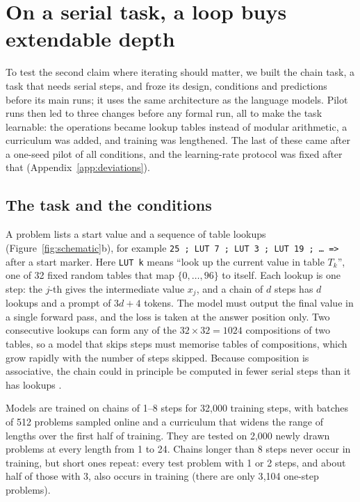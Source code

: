 \section{On a serial task, a loop buys extendable depth}
\label{sec:serial}

To test the second claim where iterating should matter, we built the chain task, a task that needs serial steps, and
froze its design, conditions and predictions before its main runs; it uses the same architecture as the language
models. Pilot runs then led to three changes before any formal run, all to make the task
learnable: the operations became lookup tables instead of modular arithmetic, a curriculum was added, and training was
lengthened. The last of these came after a one-seed pilot of all conditions, and the
learning-rate protocol was fixed after that (Appendix~\ref{app:deviations}).

\subsection{The task and the conditions}
\label{sec:task}

A problem lists a start value and a sequence of table lookups (Figure~\ref{fig:schematic}b), for example
\texttt{25 ; LUT 7 ; LUT 3 ; LUT 19 ; \ldots\ =>} after a start marker. Here \texttt{LUT k} means ``look up the
current value in table $T_k$'', one of 32 fixed random tables that map $\{0,\ldots,96\}$ to itself. Each lookup is one
step: the $j$-th gives the intermediate value $x_j$, and a chain of $d$ steps has $d$ lookups and a prompt of $3d + 4$
tokens. The model must output the final value in a single forward pass, and the loss is taken at the answer position
only. Two consecutive lookups can form any of the $32 \times 32 = 1024$ compositions of two tables, so a model that
skips steps must memorise tables of compositions, which grow rapidly with the number of steps skipped. Because
composition is associative, the chain could in principle be computed in fewer serial steps than it has lookups
\citep{liu2022shortcuts}.

Models are trained on chains of 1--8 steps for 32{,}000 training steps, with batches of 512 problems sampled online and
a curriculum that widens the range of lengths over the first half of training. They are tested on 2{,}000 newly drawn
problems at every length from 1 to 24. Chains longer than 8 steps never occur in training, but short ones repeat: every
test problem with 1 or 2 steps, and about half of those with 3, also occurs in training (there are only 3{,}104
one-step problems).

